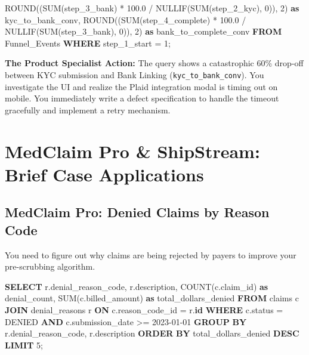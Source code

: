 \documentclass[
  11pt,
  openany,
  oneside]{book}
\newenvironment{Shaded}{}{}
\newcommand{\DecValTok}[1]{\textcolor[rgb]{0.25,0.63,0.44}{#1}}
\newcommand{\FloatTok}[1]{\textcolor[rgb]{0.25,0.63,0.44}{#1}}
\newcommand{\FunctionTok}[1]{\textcolor[rgb]{0.02,0.16,0.49}{#1}}
\newcommand{\KeywordTok}[1]{\textcolor[rgb]{0.00,0.44,0.13}{\textbf{#1}}}
\newcommand{\NormalTok}[1]{#1}
\newcommand{\OperatorTok}[1]{\textcolor[rgb]{0.40,0.40,0.40}{#1}}
\newcommand{\StringTok}[1]{\textcolor[rgb]{0.25,0.44,0.63}{#1}}
\begin{document}
\begin{Shaded}
\begin{Highlighting}[]
    \FunctionTok{ROUND}\NormalTok{((}\FunctionTok{SUM}\NormalTok{(step\_3\_bank) }\OperatorTok{*} \FloatTok{100.0} \OperatorTok{/} \FunctionTok{NULLIF}\NormalTok{(}\FunctionTok{SUM}\NormalTok{(step\_2\_kyc), }\DecValTok{0}\NormalTok{)), }\DecValTok{2}\NormalTok{) }\KeywordTok{as}\NormalTok{ kyc\_to\_bank\_conv,}
    \FunctionTok{ROUND}\NormalTok{((}\FunctionTok{SUM}\NormalTok{(step\_4\_complete) }\OperatorTok{*} \FloatTok{100.0} \OperatorTok{/} \FunctionTok{NULLIF}\NormalTok{(}\FunctionTok{SUM}\NormalTok{(step\_3\_bank), }\DecValTok{0}\NormalTok{)), }\DecValTok{2}\NormalTok{) }\KeywordTok{as}\NormalTok{ bank\_to\_complete\_conv}
\KeywordTok{FROM}\NormalTok{ Funnel\_Events}
\KeywordTok{WHERE}\NormalTok{ step\_1\_start }\OperatorTok{=} \DecValTok{1}\NormalTok{;}
\end{Highlighting}
\end{Shaded}

\textbf{The Product Specialist Action:} The query shows a catastrophic
60\% drop-off between KYC submission and Bank Linking
(\texttt{kyc\_to\_bank\_conv}). You investigate the UI and realize the
Plaid integration modal is timing out on mobile. You immediately write a
defect specification to handle the timeout gracefully and implement a
retry mechanism.

\bigskip

\section{MedClaim Pro \& ShipStream: Brief Case
Applications}\label{medclaim-pro-shipstream-brief-case-applications}

\subsection{MedClaim Pro: Denied Claims by Reason
Code}\label{medclaim-pro-denied-claims-by-reason-code}

You need to figure out why claims are being rejected by payers to
improve your pre-scrubbing algorithm.

\begin{Shaded}
\begin{Highlighting}[]
\KeywordTok{SELECT} 
\NormalTok{    r.denial\_reason\_code,}
\NormalTok{    r.description,}
    \FunctionTok{COUNT}\NormalTok{(c.claim\_id) }\KeywordTok{as}\NormalTok{ denial\_count,}
    \FunctionTok{SUM}\NormalTok{(c.billed\_amount) }\KeywordTok{as}\NormalTok{ total\_dollars\_denied}
\KeywordTok{FROM}\NormalTok{ claims c}
\KeywordTok{JOIN}\NormalTok{ denial\_reasons r }\KeywordTok{ON}\NormalTok{ c.reason\_code\_id }\OperatorTok{=}\NormalTok{ r.}\KeywordTok{id}
\KeywordTok{WHERE}\NormalTok{ c.status }\OperatorTok{=} \StringTok{\textquotesingle{}DENIED\textquotesingle{}} 
  \KeywordTok{AND}\NormalTok{ c.submission\_date }\OperatorTok{\textgreater{}=} \StringTok{\textquotesingle{}2023{-}01{-}01\textquotesingle{}}
\KeywordTok{GROUP} \KeywordTok{BY}\NormalTok{ r.denial\_reason\_code, r.description}
\KeywordTok{ORDER} \KeywordTok{BY}\NormalTok{ total\_dollars\_denied }\KeywordTok{DESC}
\KeywordTok{LIMIT} \DecValTok{5}\NormalTok{;}
\end{Highlighting}
\end{Shaded}
\end{document}
